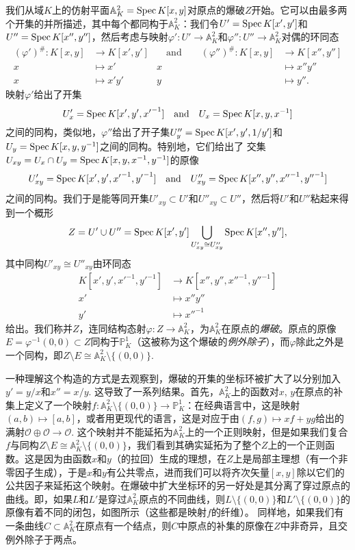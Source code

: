 \begin{exa}\label{exa:4.14}
	我们从域$K$上的仿射平面$\mathbb A_K^2=\operatorname{Spec} K[x,y]$对原点的爆破$Z$开始。它可以由最多两个开集的并所描述，其中每个都同构于$\mathbb A_K^2$：我们令$U'=\operatorname{Spec} K[x',y']$和$U''=\operatorname{Spec} K[x'',y'']$，然后考虑与映射$\varphi':U'\to \mathbb A_K^2$和$\varphi'':U''\to \mathbb A_K^2$对偶的环同态
	\[
	\begin{aligned}
		(\varphi')^\#:K[x,y]&\longrightarrow K[x',y']&\quad \text{and}\qquad (\varphi'')^\#:K[x,y]&\longrightarrow K[x'',y'']\\
		x&\longmapsto x'& x&\longmapsto x''y''\\
		x&\longmapsto x'y'& y&\longmapsto y''.
	\end{aligned}
	\]
	映射$\varphi'$给出了开集
	\[
	U'_x=\operatorname{Spec} K[x',y',{x'}^{-1}]\quad \text{and}\quad 
	U_x=\operatorname{Spec} K[x,y,x^{-1}]
	\]
	之间的同构，类似地，$\varphi''$给出了开子集$U''_y=\operatorname{Spec} K[x',y',1/y']$和$U_y=\operatorname{Spec} K[x,y,y^{-1}]$之间的同构。特别地，它们给出了
	交集$U_{xy}=U_x\cap U_y=\operatorname{Spec} K[x,y,x^{-1},y^{-1}]$的原像
	\[
	U'_{xy}=\operatorname{Spec} K[x',y',{x'}^{-1},{y'}^{-1}]\quad \text{and}\quad 
	U''_{xy}=\operatorname{Spec} K[x'',y'',{x''}^{-1},{y''}^{-1}]
	\]
	之间的同构。我们于是能等同开集$U'_{xy}\subset U'$和$U''_{xy}\subset U''$，然后将$U'$和$U''$粘起来得到一个概形
	\[
		Z=U'\cup U''=\operatorname{Spec} K[x',y']\bigcup_{U'_{xy}\cong U''_{xy}}\operatorname{Spec} K[x'',y''],
	\]
	其中同构$U'_{xy}\cong U''_{xy}$由环同态
	\[
	\begin{aligned}
		K[x',y',{x'}^{-1},{y'}^{-1}]&\longrightarrow 
		K[x'',y'',{x''}^{-1},{y''}^{-1}]\\
		x'&\longmapsto x''y''\\
		y'&\longmapsto {x''}^{-1}
	\end{aligned}
	\]
	给出。我们称并$Z$，连同结构态射$\varphi:Z\to \mathbb A_K^2$，为$\mathbb A_K^2$在原点的\textit{爆破}。原点的原像$E=\varphi^{-1}(0,0)\subset Z$同构于$\mathbb P_K^1$（这被称为这个爆破的\textit{例外除子}），而$\varphi$除此之外是一个同构，即$Z\setminus E\cong \mathbb A_K^2\setminus \{(0,0)\}$.
\end{exa}


一种理解这个构造的方式是去观察到，爆破的开集的坐标环被扩大了以分别加入$y'=y/x$和$x''=x/y$. 这导致了一系列结果。首先，$\mathbb A_K^2$上的函数对$x$, $y$在原点的补集上定义了一个映射$f:\mathbb A_K^2\setminus \{(0,0)\}\to \mathbb P_K^1$：在经典语言中，这是映射$(a,b)\mapsto [a,b]$，或者用更现代的语言，这是对应于由$(f,g)\mapsto xf+yg$给出的满射$\mathscr O\oplus \mathscr O\to \mathscr O$. 这个映射并不能延拓为$\mathbb A_K^2$上的一个正则映射，但是如果我们复合$f$与同构$Z\setminus E\cong \mathbb A_K^2\setminus \{(0,0)\}$，我们看到其确实延拓为了整个$Z$上的一个正则函数。这是因为由函数$x$和$y$（的拉回）生成的理想，在$Z$上是局部主理想（有一个非零因子生成），于是$x$和$y$有公共零点，进而我们可以将齐次矢量$[x,y]$除以它们的公共因子来延拓这个映射。在爆破中扩大坐标环的另一好处是其分离了穿过原点的曲线。即，如果$L$和$L'$是穿过$\mathbb A_K^2$原点的不同曲线，则$L\setminus \{(0,0)\}$和$L'\setminus \{(0,0)\}$的原像有着不同的闭包，如图所示（这些都是映射$f$的纤维）。
同样地，如果我们有一条曲线$C\subset \mathbb A_K^2$在原点有一个结点，则$C$中原点的补集的原像在$Z$中非奇异，且交例外除子于两点。

